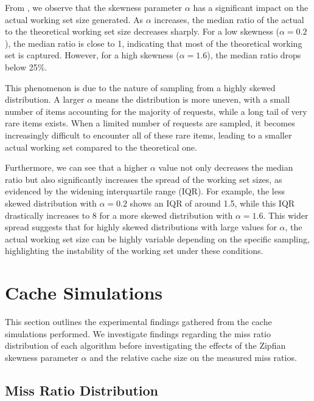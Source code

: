From , we observe that the skewness parameter $\alpha$ has a significant impact on the actual working set size generated. As $\alpha$ increases, the median ratio of the actual to the theoretical working set size decreases sharply. For a low skewness ($\alpha=0.2$), the median ratio is close to 1, indicating that most of the theoretical working set is captured. However, for a high skewness ($\alpha=1.6$), the median ratio drops below 25\%.

This phenomenon is due to the nature of sampling from a highly skewed distribution. A larger $\alpha$ means the distribution is more uneven, with a small number of items accounting for the majority of requests, while a long tail of very rare items exists. When a limited number of requests are sampled, it becomes increasingly difficult to encounter all of these rare items, leading to a smaller actual working set compared to the theoretical one.

Furthermore, we can see that a higher $\alpha$ value not only decreases the median ratio but also significantly increases the spread of the working set sizes, as evidenced by the widening interquartile range (IQR). For example, the less skewed distribution with $\alpha=0.2$ shows an IQR of around 1.5, while this IQR drastically increases to 8 for a more skewed distribution with $\alpha=1.6$. This wider spread suggests that for highly skewed distributions with large values for $\alpha$, the actual working set size can be highly variable depending on the specific sampling, highlighting the instability of the working set under these conditions.





\section{Cache Simulations}\label{res:cache-sim}

This section outlines the experimental findings gathered from the cache simulations performed. We investigate findings regarding the miss ratio distribution of each algorithm before investigating the effects of the Zipfian skewness parameter $\alpha$ and the relative cache size on the measured miss ratios.

\subsection{Miss Ratio Distribution}\label{results:miss-ratio-distribution}

